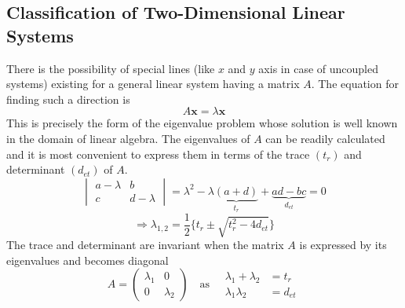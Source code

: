 \subsection{Classification of Two-Dimensional Linear Systems}{\label{sec:cls}}
There is the possibility of special lines (like $x$ and $y$ axis in case of uncoupled systems) existing for a general linear system having a matrix $A$.
The equation for finding such a direction is
\begin{equation}
	A\mathbf{x}=\lambda\mathbf{x}
\end{equation}
This is precisely the form of the eigenvalue problem whose solution is well known in the domain of linear algebra.
The eigenvalues of $A$ can be readily calculated and it is most convenient to express them in terms of the trace $(t_r)$ and determinant $(d_{et})$ of $A$.
\begin{equation}
	\begin{vmatrix}
		a-\lambda&b\\c&d-\lambda
	\end{vmatrix}
	=\lambda^2-\lambda\underbrace{(a+d)}_{t_r}+\underbrace{ad-bc}_{d_{et}}=0
\end{equation}
\begin{equation}
	\Rightarrow \lambda_{1,2}=\frac{1}{2}\{t_r\pm\sqrt{t_r^2-4d_{et}}\}
\end{equation}
The trace and determinant are invariant when the matrix $A$ is expressed by its eigenvalues and becomes diagonal
\begin{equation}
	A=
	\begin{pmatrix}
		\lambda_1&0\\0&\lambda_2
	\end{pmatrix}
	\quad \text{as} \quad
	\begin{aligned}
		\lambda_1+\lambda_2&=t_r\\
		\lambda_1\lambda_2&=d_{et}
	\end{aligned}
\end{equation}
